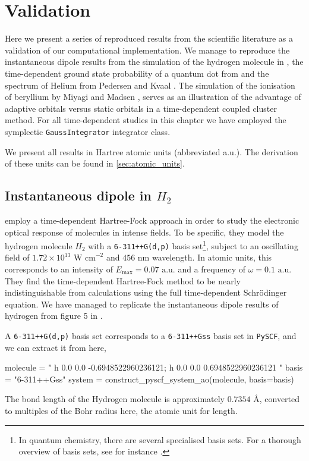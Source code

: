 \chapter{Validation}
\label{ch:validation}

Here we present a series of reproduced results from the scientific literature as 
a validation of our computational implementation. We manage to reproduce the 
instantaneous dipole results from the simulation of the 
hydrogen molecule in \citeauthor{li2005time} \cite{li2005time},
the time-dependent ground state probability of a quantum dot from 
\citeauthor{Zanghellini04} \cite{Zanghellini04}
and the spectrum of Helium from
Pedersen and Kvaal \cite{pedersen2019symplectic}.
The simulation of the ionisation of beryllium 
by Miyagi and Madsen \cite{miyagi2013time},
serves as an illustration of the advantage of
adaptive orbitals versus static orbitals in a time-dependent coupled cluster method.
For all time-dependent studies in this chapter we have employed the symplectic 
\lstinline{GaussIntegrator} integrator class.

We present all results in Hartree atomic units (abbreviated a.u.). The derivation of these
units can be found in \autoref{sec:atomic_units}.


\section{Instantaneous dipole in $H_2$}

\citeauthor{li2005time} \cite{li2005time} employ a time-dependent Hartree-Fock 
approach in order to study the electronic optical response of molecules 
in intense fields. To be specific, they model the hydrogen molecule $H_2$ 
with a \lstinline{6-311++G(d,p)} basis 
set\footnote{In quantum chemistry, there are several specialised basis sets. For a
thorough overview of basis sets, see for instance
\citeauthor{jensen2017introduction} \cite{jensen2017introduction}.}, subject to an oscillating field 
of $1.72\times10^{13}\text{ W cm}^{-2}$ and $456\text{ nm}$ wavelength. 
In atomic units, this corresponds to an intensity of $E_\text{max} = 0.07 \text{ a.u.}$ and
a frequency of $\omega=0.1 \text{ a.u.}$
They find the time-dependent
Hartree-Fock method to be nearly indistinguishable from calculations using the 
full time-dependent Schrödinger equation. We have managed to replicate the 
instantaneous dipole results of hydrogen from figure 5 in
\citeauthor{li2005time} \cite{li2005time}.

A \lstinline{6-311++G(d,p)} basis set corresponds to a \lstinline{6-311++Gss} 
basis set in \lstinline{PySCF}, and we can extract it from here,
\begin{python}
molecule = "
    h 0.0 0.0 -0.6948522960236121;
    h 0.0 0.0  0.6948522960236121
    "
basis = "6-311++Gss"
system = construct_pyscf_system_ao(molecule, basis=basis)
\end{python}
The bond length of the Hydrogen molecule is approximately $0.7354\text{ Å}$, converted 
to multiples of the Bohr radius here, the atomic unit for length.

